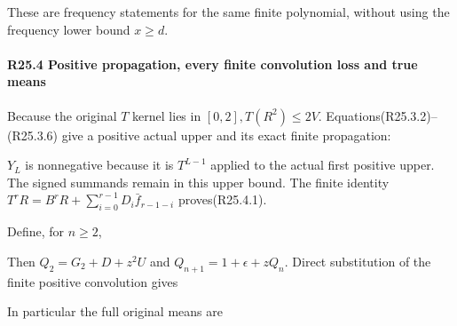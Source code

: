 These are frequency statements for the same finite polynomial, without using the frequency lower bound \(x\ge d\).

\paragraph{R25.4 Positive propagation, every finite convolution loss and true means}
\label{part:R25:finite-propagation}

Because the original \(T\) kernel lies in \([0,\allowbreak \allowbreak 2],\allowbreak \allowbreak  T(R^2)\le 2V\). Equations(R25.3.2)--(R25.3.6) give a positive actual upper and its exact finite propagation:


\(Y_L\) is nonnegative because it is \(T^{L-1}\) applied to the actual first positive upper. The signed summands remain in this upper bound. The finite identity \(T^rR=B^rR+\sum_{i=0}^{r-1}D_i \bar f_{r-1-i}\) proves(R25.4.1).

Define, for \(n\ge 2\),


Then \(Q_{2}=G_{2}+D+z^2U\) and \(Q_{n+1}=1+\epsilon+z Q_n\). Direct substitution of the finite positive convolution gives


In particular the full original means are


